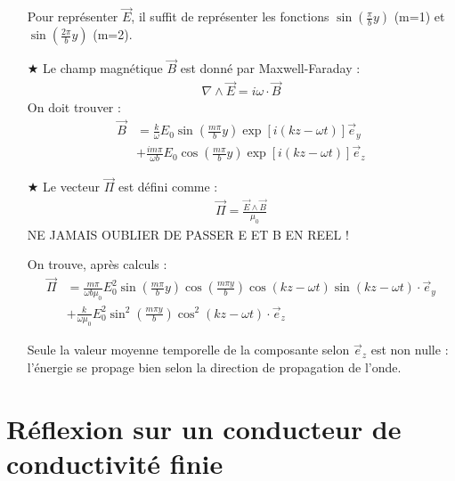 \documentclass{report}
\begin{document}
\begin{itemize}
	 Pour représenter $\vec{E}$, il suffit de représenter les fonctions $\sin(\frac{\pi}{b}y)$ (m=1) et $\sin(\frac{2\pi}{b}y)$ (m=2).
	
	\item[$\bigstar$] Le champ magnétique $\vec{B}$ est donné par Maxwell-Faraday :
	\begin{align*}
		\nabla\wedge \vec{E}=i\omega\cdot\vec{B}
	\end{align*}
	On doit trouver :
	\begin{align*}
		\vec{B}&=\frac{k}{\omega}E_0\sin\left(\frac{m\pi}{b}y\right) \exp[i(kz-\omega t)]\vec{e}_y \\
		&+\frac{im\pi}{\omega b}E_0\cos\left(\frac{m\pi}{b}y\right) \exp[i(kz-\omega t)]\vec{e}_z
	\end{align*}
	
	\item[$\bigstar$] Le vecteur $\vec{\Pi}$ est défini comme :
	\begin{align*}
		\vec{\Pi}=\frac{\vec{E}\wedge\vec{B}}{\mu_0}
	\end{align*}
	NE JAMAIS OUBLIER DE PASSER E ET B EN REEL ! 
	
	On trouve, après calculs :
	\begin{align*}
		\vec{\Pi}&=\frac{m\pi}{\omega b\mu_0}E_0^2\sin\left(\frac{m\pi}{b}y\right)\cos\left(\frac{m\pi y}{b}\right)\cos(kz-\omega t)\sin(kz-\omega t)\cdot\vec{e}_y \\
		&+\frac{k}{\omega\mu_0}E_0^2\sin^2\left(\frac{m\pi y}{b}\right)\cos^2(kz-\omega t)\cdot\vec{e}_z
	\end{align*}
	
	Seule la valeur moyenne temporelle de la composante selon 	$\vec{e}_z$ est non nulle : l'énergie se propage bien selon la direction de propagation de l'onde.
	
\end{itemize}

\section*{Réflexion sur un conducteur de conductivité finie}
\end{document}
